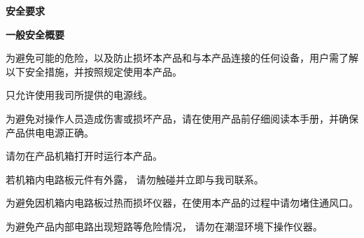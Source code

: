 
\newpage
\xiaoer \textbf{安全要求}
\vspace{1.1cm}

\noindent\sanhao\textbf{一般安全概要}
\vspace{0.7cm}
\song

为避免可能的危险，以及防止损坏本产品和与本产品连接的任何设备，用户需了解以下安全措施，并按照规定使用本产品。

\vspace{0.7cm}

\vspace{0.2cm}
只允许使用我司所提供的电源线。

\vspace{0.7cm}

\vspace{0.2cm}
为避免对操作人员造成伤害或损坏产品，请在使用产品前仔细阅读本手册，并确保产品供电电源正确。

\vspace{0.7cm}

\vspace{0.2cm}
请勿在产品机箱打开时运行本产品。

\vspace{0.7cm}

\vspace{0.2cm}
若机箱内电路板元件有外露， 请勿触碰并立即与我司联系。

\vspace{0.7cm}

\vspace{0.2cm}
为避免因机箱内电路板过热而损坏仪器，在使用本产品的过程中请勿堵住通风口。

\vspace{0.7cm}

\vspace{0.2cm}
为避免产品内部电路出现短路等危险情况， 请勿在潮湿环境下操作仪器。


\vspace{0.7cm}

